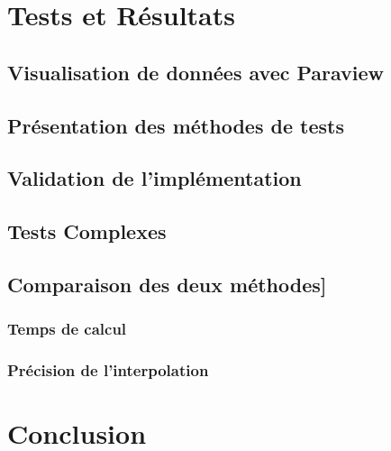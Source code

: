 \documentclass[a4paper,9pt]{article}
\begin{document}
\section{Tests et Résultats}
\label{sec:tests_resultats}

\subsection{Visualisation de données avec Paraview}
\label{subsec:paraview}

\subsection{Présentation des méthodes de tests}
\label{subsec:presentation_tests}

\subsection{Validation de l'implémentation}
\label{subsec:validation_implementation}

\subsection{Tests Complexes}
\label{subsec:tests_complexes}

\subsection{Comparaison des deux méthodes]}
\label{subsec:comparaison_methodes}

\subsubsection{Temps de calcul}
\label{subsec:temps_calcul}

\subsubsection{Précision de l'interpolation}
\label{subsec:precision_interpolation}

\section{Conclusion}
\label{sec:conclusion}
\end{document}
